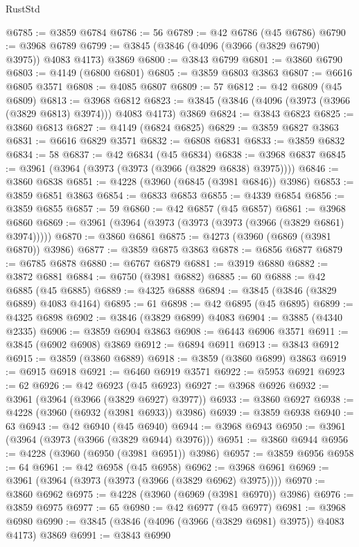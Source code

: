 \begin{lexlean}{RustStd}
\begin{coremodule}
@6785 := @3859 @6784
@6786 := 56
@6789 := @42 @6786 (@45 @6786)
@6790 := @3968 @6789
@6799 := @3845 (@3846 (@4096 (@3966 (@3829 @6790) @3975)) @4083 @4173) @3869
@6800 := @3843 @6799
@6801 := @3860 @6790
@6803 := @4149 (@6800 @6801)
@6805 := @3859 @6803 @3863
@6807 := @6616 @6805 @3571
@6808 := @4085 @6807
@6809 := 57
@6812 := @42 @6809 (@45 @6809)
@6813 := @3968 @6812
@6823 := @3845 (@3846 (@4096 (@3973 (@3966 (@3829 @6813) @3974))) @4083 @4173) @3869
@6824 := @3843 @6823
@6825 := @3860 @6813
@6827 := @4149 (@6824 @6825)
@6829 := @3859 @6827 @3863
@6831 := @6616 @6829 @3571
@6832 := @6808 @6831
@6833 := @3859 @6832
@6834 := 58
@6837 := @42 @6834 (@45 @6834)
@6838 := @3968 @6837
@6845 := @3961 (@3964 (@3973 (@3973 (@3966 (@3829 @6838) @3975))))
@6846 := @3860 @6838
@6851 := @4228 (@3960 (@6845 (@3981 @6846)) @3986)
@6853 := @3859 @6851 @3863
@6854 := @6833 @6853
@6855 := @4339 @6854
@6856 := @3859 @6855
@6857 := 59
@6860 := @42 @6857 (@45 @6857)
@6861 := @3968 @6860
@6869 := @3961 (@3964 (@3973 (@3973 (@3973 (@3966 (@3829 @6861) @3974)))))
@6870 := @3860 @6861
@6875 := @4273 (@3960 (@6869 (@3981 @6870)) @3986)
@6877 := @3859 @6875 @3863
@6878 := @6856 @6877
@6879 := @6785 @6878
@6880 := @6767 @6879
@6881 := @3919 @6880
@6882 := @3872 @6881
@6884 := @6750 (@3981 @6882)
@6885 := 60
@6888 := @42 @6885 (@45 @6885)
@6889 := @4325 @6888
@6894 := @3845 (@3846 (@3829 @6889) @4083 @4164)
@6895 := 61
@6898 := @42 @6895 (@45 @6895)
@6899 := @4325 @6898
@6902 := @3846 (@3829 @6899) @4083
@6904 := @3885 (@4340 @2335)
@6906 := @3859 @6904 @3863
@6908 := @6443 @6906 @3571
@6911 := @3845 (@6902 @6908) @3869
@6912 := @6894 @6911
@6913 := @3843 @6912
@6915 := @3859 (@3860 @6889)
@6918 := @3859 (@3860 @6899) @3863
@6919 := @6915 @6918
@6921 := @6460 @6919 @3571
@6922 := @5953 @6921
@6923 := 62
@6926 := @42 @6923 (@45 @6923)
@6927 := @3968 @6926
@6932 := @3961 (@3964 (@3966 (@3829 @6927) @3977))
@6933 := @3860 @6927
@6938 := @4228 (@3960 (@6932 (@3981 @6933)) @3986)
@6939 := @3859 @6938
@6940 := 63
@6943 := @42 @6940 (@45 @6940)
@6944 := @3968 @6943
@6950 := @3961 (@3964 (@3973 (@3966 (@3829 @6944) @3976)))
@6951 := @3860 @6944
@6956 := @4228 (@3960 (@6950 (@3981 @6951)) @3986)
@6957 := @3859 @6956
@6958 := 64
@6961 := @42 @6958 (@45 @6958)
@6962 := @3968 @6961
@6969 := @3961 (@3964 (@3973 (@3973 (@3966 (@3829 @6962) @3975))))
@6970 := @3860 @6962
@6975 := @4228 (@3960 (@6969 (@3981 @6970)) @3986)
@6976 := @3859 @6975
@6977 := 65
@6980 := @42 @6977 (@45 @6977)
@6981 := @3968 @6980
@6990 := @3845 (@3846 (@4096 (@3966 (@3829 @6981) @3975)) @4083 @4173) @3869
@6991 := @3843 @6990

\end{coremodule}
\end{lexlean}
